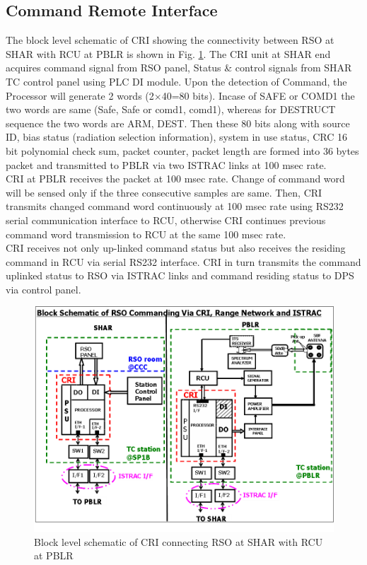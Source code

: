 \subsection{Command Remote Interface}

The block level schematic of CRI showing the connectivity between RSO at SHAR with RCU at PBLR is shown in Fig. \ref{FIG:CRIConnectivity}. The CRI unit at SHAR end acquires command signal from RSO panel, Status \& control signals from SHAR TC control panel using PLC DI module.  Upon the detection of Command, the Processor will generate 2 words (2$\times$40=80 bits). Incase of SAFE or COMD1 the two words are same (Safe, Safe or comd1, comd1), whereas for DESTRUCT sequence the two words are ARM, DEST. Then these 80 bits along with source ID, bias status (radiation selection information), system in use status, CRC 16 bit polynomial check sum, packet counter, packet length are formed into 36 bytes packet and transmitted to PBLR via two ISTRAC links at 100 msec rate. \\ 

CRI at PBLR receives the packet at 100 msec rate. Change of command word will be sensed only if the three consecutive samples are same. Then, CRI transmits changed command word continuously at 100 msec rate using RS232 serial communication interface to RCU, otherwise CRI continues previous command word transmission to RCU at the same 100 msec rate. \\

CRI receives not only up-linked command status but also receives the residing command in RCU via serial RS232 interface. CRI in turn transmits the command uplinked status to RSO via ISTRAC links and command residing status to DPS via control panel.


\begin{figure}[H]
	\centering
	\includegraphics[width=\linewidth]{./Diagrams/BlockLevelSchematicCRISharPblr.png}
	\caption{Block level schematic of CRI connecting RSO at SHAR with RCU at PBLR}
	\label{FIG:CRIConnectivity}
\end{figure}

